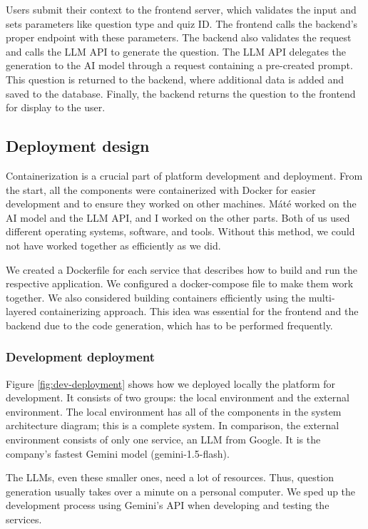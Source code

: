 Users submit their context to the frontend server, which validates the input and sets parameters like question type and quiz ID. The frontend calls the backend's proper endpoint with these parameters. The backend also validates the request and calls the LLM API to generate the question. The LLM API delegates the generation to the AI model through a request containing a pre-created prompt. This question is returned to the backend, where additional data is added and saved to the database. Finally, the backend returns the question to the frontend for display to the user.

\subsection{Deployment design}

Containerization is a crucial part of platform development and deployment. From the start, all the components were containerized with Docker for easier development and to ensure they worked on other machines. Máté worked on the AI model and the LLM API, and I worked on the other parts. Both of us used different operating systems, software, and tools. Without this method, we could not have worked together as efficiently as we did.

We created a Dockerfile for each service that describes how to build and run the respective application. We configured a docker-compose file to make them work together. We also considered building containers efficiently using the multi-layered containerizing approach. This idea was essential for the frontend and the backend due to the code generation, which has to be performed frequently.

\subsubsection{Development deployment}

Figure \ref{fig:dev-deployment} shows how we deployed locally the platform for development. It consists of two groups: the local environment and the external environment. The local environment has all of the components in the system architecture diagram; this is a complete system. In comparison, the external environment consists of only one service, an LLM from Google. It is the company's fastest Gemini model (gemini-1.5-flash). 

The LLMs, even these smaller ones, need a lot of resources. Thus, question generation usually takes over a minute on a personal computer. We sped up the development process using Gemini's API when developing and testing the services.

